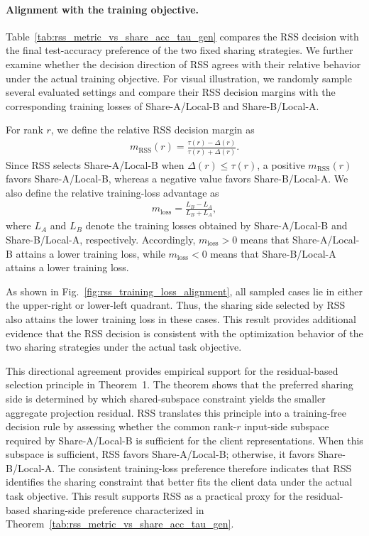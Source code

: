 \documentclass[lettersize,journal]{IEEEtran}
\begin{document}
        {\color{black}\paragraph{Alignment with the training objective.}
Table~\ref{tab:rss_metric_vs_share_acc_tau_gen} compares the RSS
decision with the final test-accuracy preference of the two
fixed sharing strategies. We further examine whether the
decision direction of RSS agrees with their relative behavior
under the actual training objective. For visual illustration,
we randomly sample several evaluated settings and compare
their RSS decision margins with the corresponding training
losses of Share-A/Local-B and Share-B/Local-A.

For rank $r$, we define the relative RSS decision margin as
\begin{align}
    m_{\mathrm{RSS}}(r)
    =
    \frac{
        \tau(r)-\Delta(r)
    }{
        \tau(r)+\Delta(r)
    }.
    \label{eq:rss_relative_margin}
\end{align}
Since RSS selects Share-A/Local-B when
$\Delta(r)\leq\tau(r)$, a positive
$m_{\mathrm{RSS}}(r)$ favors Share-A/Local-B, whereas a
negative value favors Share-B/Local-A. We also define the
relative training-loss advantage as
\begin{align}
    m_{\mathrm{loss}}
    =
    \frac{
        L_B-L_A
    }{
        L_B+L_A
    },
    \label{eq:loss_relative_margin}
\end{align}
where $L_A$ and $L_B$ denote the training losses obtained
by Share-A/Local-B and Share-B/Local-A, respectively.
Accordingly, $m_{\mathrm{loss}}>0$ means that
Share-A/Local-B attains a lower training loss, while
$m_{\mathrm{loss}}<0$ means that Share-B/Local-A attains
a lower training loss.

As shown in Fig.~\ref{fig:rss_training_loss_alignment}, all
sampled cases lie in either the upper-right or lower-left
quadrant. Thus, the sharing side selected by RSS also attains
the lower training loss in these cases. This result provides
additional evidence that the RSS decision is consistent with
the optimization behavior of the two sharing strategies under
the actual task objective.

This directional agreement provides empirical support for
the residual-based selection principle in Theorem~1. The
theorem shows that the preferred sharing side is determined
by which shared-subspace constraint yields the smaller
aggregate projection residual. RSS translates this principle
into a training-free decision rule by assessing whether the
common rank-$r$ input-side subspace required by
Share-A/Local-B is sufficient for the client representations.
When this subspace is sufficient, RSS favors
Share-A/Local-B; otherwise, it favors Share-B/Local-A.
The consistent training-loss preference therefore indicates
that RSS identifies the sharing constraint that better fits the
client data under the actual task objective. This result
supports RSS as a practical proxy for the residual-based
sharing-side preference characterized in Theorem~\ref{tab:rss_metric_vs_share_acc_tau_gen}.}
\end{document}
